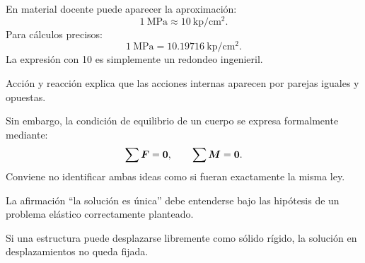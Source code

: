 

En material docente puede aparecer la aproximación:
\[
1\ \mathrm{MPa}\approx10\ \mathrm{kp/cm^2}.
\]
Para cálculos precisos:
\[
\boxed{1\ \mathrm{MPa}=10.19716\ \mathrm{kp/cm^2}}.
\]
La expresión con 10 es simplemente un redondeo ingenieril.

Acción y reacción explica que las acciones internas aparecen por parejas iguales y opuestas.

Sin embargo, la condición de equilibrio de un cuerpo se expresa formalmente mediante:
\[
\sum\boldsymbol{F}=\boldsymbol{0},
\qquad
\sum\boldsymbol{M}=\boldsymbol{0}.
\]
Conviene no identificar ambas ideas como si fueran exactamente la misma ley.

La afirmación “la solución es única” debe entenderse bajo las hipótesis de un problema elástico correctamente planteado.

Si una estructura puede desplazarse libremente como sólido rígido, la solución en desplazamientos no queda fijada.

